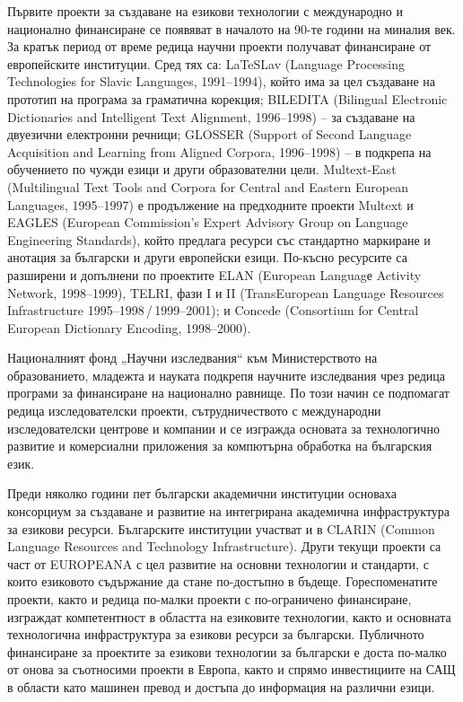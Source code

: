 \documentclass[]{../../metanetpaper}
\begin{document}
\begin{multicols}{2}
Първите проекти за създаване на езикови
 технологии с международно и национално финансиране
 се появяват в началото на 90-те години на миналия
 век. За кратък период от време редица научни проекти
 получават финансиране от европейските институции.
 Сред тях са: LaTeSLav (Language Processing Technologies for Slavic Languages, 1991--1994), който има за цел
 създаване на прототип на програма за граматична
 корекция; BILEDITA (Bilingual Electronic Dictionaries and Intelligent Text Alignment, 1996--1998) – за създаване на
 двуезични електронни речници; GLOSSER (Support of Second Language Acquisition and Learning from Aligned Corpora, 1996--1998)
 – в подкрепа на обучението по чужди езици и други
 образователни цели. Multext-East (Multilingual Text Tools and Corpora for Central and Eastern European Languages, 1995--1997) е
 продължение на предходните проекти Multext и EAGLES (European Commission's Expert Advisory Group on Language Engineering Standards), който предлага ресурси със стандартно маркиране
 и анотация за български
и други европейски езици. По-късно ресурсите са разширени и допълнени по проектите ELAN (European Languagе Activity Network, 1998--1999), TELRI, фази I и II (TransEuropean Language Resources Infrastructure 1995--1998\,/\,1999--2001); и Concede (Consortium for Central European
 Dictionary Encoding, 1998--2000).

Националният фонд „Научни изследвания“ към Министерството на образованието, младежта и науката
 подкрепя научните изследвания чрез редица програми
 за финансиране на национално равнище. По този начин се подпомагат редица изследователски проекти, сътрудничеството с международни изследователски
 центрове и компании и се изгражда основата
 за технологично развитие и комерсиални приложения за
компютърна обработка на българския език.

Преди няколко години пет български академични институции основаха консорциум за създаване и развитие на интегрирана академична инфраструктура за
 езикови ресурси. Българските институции участват и в
 CLARIN  (Common Language Resources and Technology Infrastructure). Други текущи проекти са част от EUROPEANA с
 цел развитие на основни технологии и стандарти, с които
езиковото съдържание да стане по-достъпно в бъдеще.
 Гореспоменатите проекти, както и редица по-малки
 проекти с по-ограничено финансиране, изграждат
 компетентност в областта на езиковите технологии,
 както и основната технологична инфраструктура за
 езикови ресурси за български. Публичното финансиране
 за проектите за езикови технологии за български е доста
 по-малко от онова за съотносими проекти в Европа, както
 и спрямо инвестициите на САЩ \cite{sprachtech} в области като машинен превод и достъпа до информация на различни езици.


\end{multicols}
\end{document}
